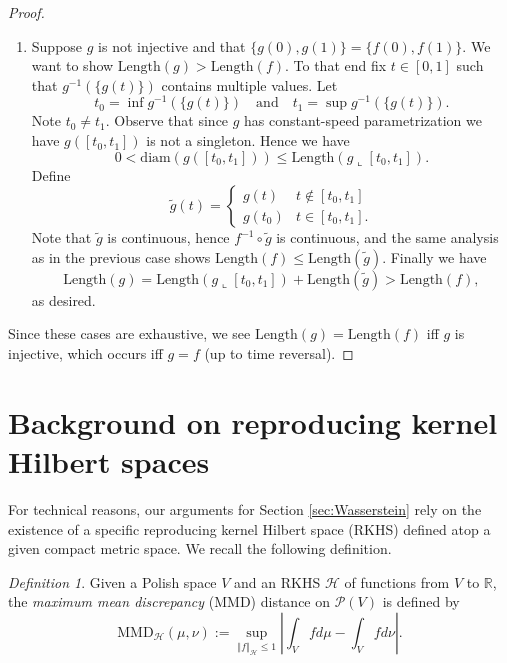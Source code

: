 \documentclass[aos, preprint]{imsart}
\theoremstyle{plain}
\theoremstyle{remark}
\newtheorem{defn}[theorem]{Definition}
\begin{document}
\begin{appendix}
\begin{proof}
\begin{enumerate}
    \item Suppose $g$ is not injective and that $\{g(0), g(1)\} =
      \{f(0), f(1)\}$. We want to show $\mathrm{Length}(g) >
      \mathrm{Length}(f)$. To that end fix $t \in [0,1]$ such that
      $g^{-1}(\{g(t)\})$ contains multiple values. Let
      \[
      t_0 = \inf g^{-1}(\{g(t)\})\quad\textrm{and}\quad t_1 = \sup g^{-1}(\{g(t)\}).
      \]
      Note $t_0 \neq t_1$. Observe that since $g$ has constant-speed
      parametrization we have $g([t_0, t_1])$ is not a singleton. Hence
      we have
      \[
      0 < \mathrm{diam}(g([t_0, t_1])) \leq
      \mathrm{Length}(g\llcorner [t_0, t_1]).
      \]
      Define
      \[
      \tilde g(t) =
      \begin{cases}
        g(t) & t \not \in [t_0, t_1] \\
        g(t_0) & t \in [t_0, t_1].
      \end{cases}
      \]
      Note that $\tilde g$ is continuous,
      hence $f^{-1} \circ \tilde g$ is continuous, and the same analysis
      as in the previous case shows $\mathrm{Length}(f) \leq
      \mathrm{Length}(\tilde g)$. Finally we have
      \[
      \mathrm{Length}(g) =
      \mathrm{Length}(g\llcorner[t_0, t_1]) + \mathrm{Length}(\tilde g) >
      \mathrm{Length}(f),
      \]
      as desired.
  \end{enumerate}
  Since these cases are exhaustive, we see $\mathrm{Length}(g) =
  \mathrm{Length}(f)$ iff $g$ is injective, which occurs iff $g = f$
  (up to time reversal).
\end{proof}

\section{Background on reproducing kernel Hilbert spaces}
\label{sec:rkhs}

For technical reasons, our arguments for Section \ref{sec:Wasserstein} rely on the existence of a specific
reproducing kernel Hilbert space (RKHS) defined atop a given compact
metric space. We recall the following definition.
\begin{defn}
Given a Polish space $V$ and an RKHS $\mathcal{H}$ of functions
from $V$ to $\mathbb{R}$, the \emph{maximum mean discrepancy} (MMD)
distance on $\mathcal{P}(V)$ is defined by
\[
\text{MMD}_{\mathcal{H}}(\mu,\nu):=\sup_{\Vert f\Vert_{\mathcal{H}}\leq1}\left|\int_{V}fd\mu-\int_{V}fd\nu\right|.
\]
\end{defn}


\end{appendix}
\end{document}
